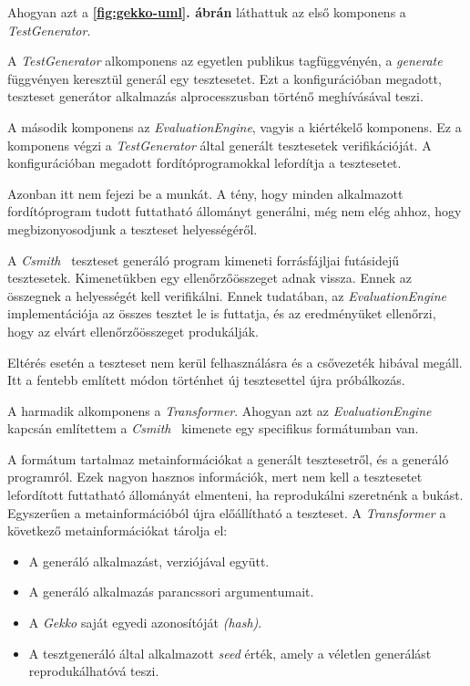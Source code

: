         Ahogyan azt a \textbf{\ref{fig:gekko-uml}. ábrán} láthattuk az első komponens a \textit{TestGenerator}.

        A \textit{TestGenerator} alkomponens az egyetlen publikus tagfüggvényén, a \textit{generate} függvényen
        keresztül generál egy tesztesetet. Ezt a konfigurációban megadott, teszteset generátor alkalmazás
        alprocesszusban történő meghívásával teszi.

        A második komponens az \textit{EvaluationEngine}, vagyis a kiértékelő komponens. Ez a komponens végzi a
        \textit{TestGenerator} által generált tesztesetek verifikációját. A konfigurációban megadott
        fordítóprogramokkal lefordítja a tesztesetet.

        Azonban itt nem fejezi be a munkát. A tény, hogy minden alkalmazott fordítóprogram tudott futtatható állományt
        generálni, még nem elég ahhoz, hogy megbizonyosodjunk a teszteset helyességéről.

        \pagebreak
        A \textit{Csmith}~\cite{csmith} teszteset generáló program kimeneti forrásfájljai futásidejű tesztesetek.
        Kimenetükben egy ellenőrzőösszeget adnak vissza. Ennek az összegnek a helyességét kell verifikálni. Ennek
        tudatában, az \textit{EvaluationEngine} implementációja az összes tesztet le is futtatja, és az eredményüket
        ellenőrzi, hogy az elvárt ellenőrzőösszeget produkálják.

        Eltérés esetén a teszteset nem kerül felhasználásra és a csővezeték hibával megáll. Itt a fentebb említett
        módon történhet új tesztesettel újra próbálkozás.

        A harmadik alkomponens a \textit{Transformer}. Ahogyan azt az \textit{EvaluationEngine} kapcsán említettem a
        \textit{Csmith}~\cite{csmith} kimenete egy specifikus formátumban van.

        A formátum tartalmaz metainformációkat a generált tesztesetről, és a generáló programról. Ezek nagyon hasznos
        információk, mert nem kell a tesztesetet lefordított futtatható állományát elmenteni, ha reprodukálni
        szeretnénk a bukást. Egyszerűen a metainformációból újra előállítható a teszteset. A \textit{Transformer} a
        következő metainformációkat tárolja el:

        \begin{itemize}
            \item A generáló alkalmazást, verziójával együtt.
            \item A generáló alkalmazás parancssori argumentumait.
            \item A \textit{Gekko} saját egyedi azonosítóját \textit{(hash)}.
            \item A tesztgeneráló által alkalmazott \textit{seed} érték, amely a véletlen generálást reprodukálhatóvá
                  teszi.
        \end{itemize}

